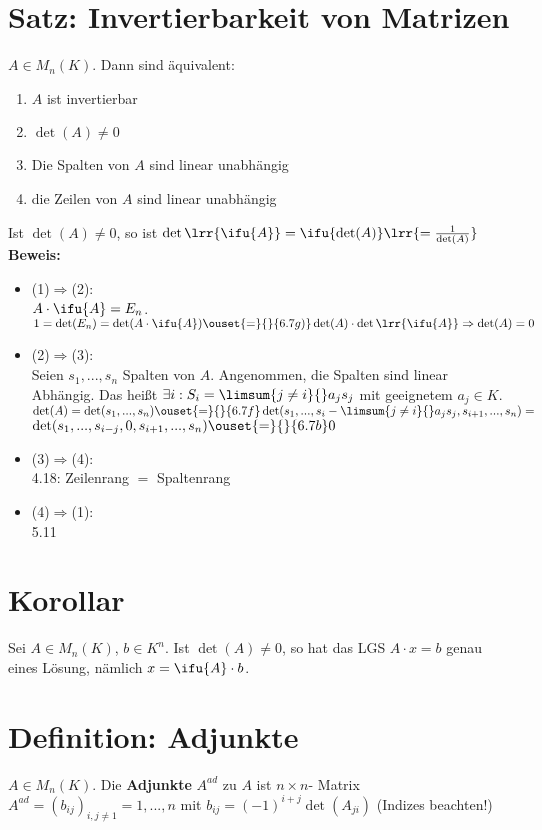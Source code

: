 \section{Satz: Invertierbarkeit von Matrizen}
  $A\in M_n(K)$. Dann sind äquivalent:
  \begin{enumerate}[(1)]
    \item $A$ ist invertierbar
    \item $\det(A)\neq 0$
    \item Die Spalten von $A$ sind linear unabhängig
    \item die Zeilen von $A$ sind linear unabhängig
  \end{enumerate}
  Ist $\det(A)\neq 0$, so ist $\det\lrr{\ifu{A}}=\ifu{\det(A)}\lrr{=\frac{1}{\det(A)}}$\\
  \textbf{Beweis:}
  \begin{itemize}
    \item (1)$\Rightarrow$(2):\\
      $A\cdot \ifu{A}=E_n$. $1=\det(E_n)=\det(A\cdot\ifu{A})\ouset{=}{}{6.7g)}\det(A)\cdot\det\lrr{\ifu{A}}\\
      \Rightarrow\det(A)=0$
    \item (2)$\Rightarrow$(3):\\
      Seien $s_1,...,s_n$ Spalten von $A$. Angenommen, die Spalten sind linear
      Abhängig. Das heißt $\exists i: S_i=\limsum{j\neq i}{}a_js_j$ mit
      geeignetem $a_j\in K$.\\
      $\det(A)=\det(s_1,...,s_n)\ouset{=}{}{6.7f}\det(s_1,...,s_i-\limsum{j\neq
      i}{}a_js_j,s_{i+1},...,s_n)=$\\
      $\det(s_1,...,s_{i-j},0,s_{i+1},...,s_n)\ouset{=}{}{6.7b}0$\lightning
    \item (3)$\Rightarrow$(4):\\
      4.18: Zeilenrang $=$ Spaltenrang
    \item (4)$\Rightarrow$(1):\\
      5.11
  \end{itemize}

\section{Korollar}
Sei $A\in M_n(K)$, $b\in K^n$. Ist $\det(A)\neq 0$, so hat das LGS $A\cdot x=b$
genau eines Lösung, nämlich $x=\ifu{A}\cdot b$.

\section{Definition: Adjunkte}
$A\in M_n(K)$. Die \textbf{Adjunkte} $A^{ad}$ zu $A$ ist $n\times n$- Matrix
$A^{ad}=(b_{ij})_{i,j\neq 1}=1,...,n$ mit $b_{ij}=(-1)^{i+j}\det(A_{ji})$
(Indizes beachten!)

